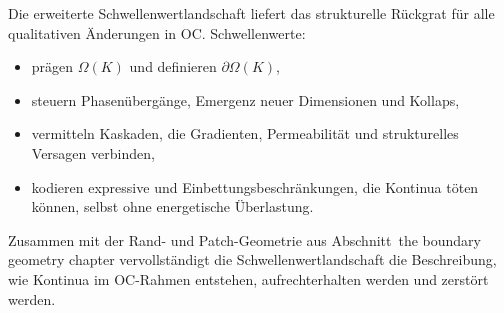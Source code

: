 Die erweiterte Schwellenwertlandschaft liefert das strukturelle Rückgrat für alle
qualitativen Änderungen in OC. Schwellenwerte:
\begin{itemize}
    \item prägen \(\Omega(K)\) und definieren \(\partial\Omega(K)\),
    \item steuern Phasenübergänge, Emergenz neuer Dimensionen und Kollaps,
    \item vermitteln Kaskaden, die Gradienten, Permeabilität und strukturelles Versagen verbinden,
    \item kodieren expressive und Einbettungsbeschränkungen, die Kontinua töten können,
          selbst ohne energetische Überlastung.
\end{itemize}

Zusammen mit der Rand- und Patch-Geometrie aus
Abschnitt~the boundary geometry chapter vervollständigt die Schwellenwertlandschaft die
Beschreibung, wie Kontinua im OC-Rahmen entstehen, aufrechterhalten werden und
zerstört werden.

